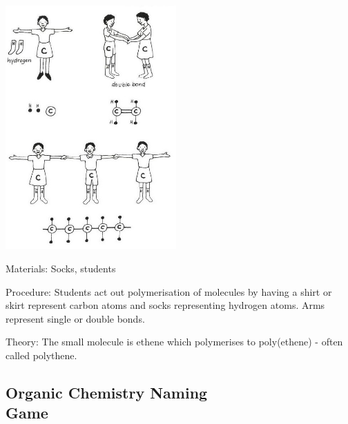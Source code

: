 \begin{multicols}{2}
\begin{center}
\includegraphics[width=0.49\textwidth]{./img/vso/polymerisation.jpg}
\end{center}

\begin{description*}
\item[Materials:]{Socks, students}
\item[Procedure:]{Students act out polymerisation of molecules by having a shirt or skirt represent carbon atoms and socks representing hydrogen atoms. Arms represent single or double bonds.}
\item[Theory:]{The small molecule is ethene which polymerises to poly(ethene) - often called polythene.}
\end{description*}

\columnbreak

\subsection[Organic Chemistry Naming Game]{Organic Chemistry Naming \hfill \\ Game}



\end{multicols}
